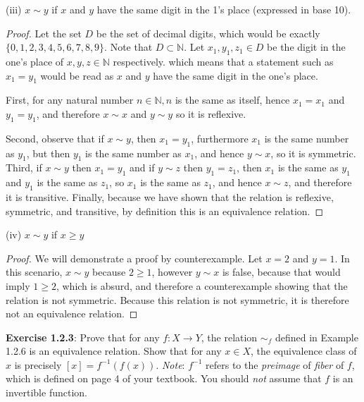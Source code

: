 \documentclass[a4paper]{article}
\begin{document}
\begin{myparindent}{0pt}
(iii) $x \sim y$ if $x$ and $y$ have the same digit in the 1's place (expressed in base 10). \newline
\begin{proof}
Let the set $D$ be the set of decimal digits, which would be exactly $\{0, 1, 2, 3, 4, 5, 6, 7, 8, 9\}$.
Note that $D \subset \mathbb{N}$.
Let $x_1, y_1, z_1 \in D$ be the digit in the one's place of $x, y, z \in \mathbb{N}$ respectively.
which means that a statement such as $x_1 = y_1$ would be read as $x$ and $y$ have the
same digit in the one's place.\newline
\newline

First, for any natural number $n \in \mathbb{N}, n$ is the same as itself,
hence $x_1 = x_1$ and $y_1 = y_1$, and therefore $x \sim x$ and $y \sim y$ so it is reflexive. \newline
\newline

Second, observe that if $x \sim y$, then $x_1 = y_1$, furthermore $x_1$ is the same number as $y_1$, but then $y_1$ is the same number as $x_1$,
and hence $y \sim x$, so it is symmetric. \newline
\newline
Third, if $x \sim y$ then $x_1 = y_1$ and if $y \sim z$ then $y_1 = z_1$, then $x_1$ is the same as $y_1$ and $y_1$ is the same as $z_1$,
so $x_1$ is the same as $z_1$, and hence $x \sim z$, and therefore it is transitive. \newline
\newline
Finally, because we have shown that the relation is reflexive, symmetric, and transitive, by definition
this is an equivalence relation.
\end{proof}


(iv) $x \sim y$ if $x \ge y$ \newline
\begin{proof}
We will demonstrate a proof by counterexample. Let $x = 2$ and $y = 1$. In this scenario, $x \sim y$ because
$2 \ge 1$, however $y \sim x$ is false, because that would imply $1 \ge 2$, which is absurd,
and therefore a counterexample showing that the relation is not symmetric.
Because this relation is not symmetric, it is therefore not an equivalence relation.
\end{proof}

\textbf{Exercise 1.2.3}:
Prove that for any $f: X \rightarrow Y$, the relation $\sim_f$ defined in Example 1.2.6 is an equivalence relation.
Show that for any $x \in X$, the equivalence class of $x$ is precisely $[x] = f^{-1}(f(x))$. \newline
\newline
\textit{Note}: $f^{-1}$ refers to the \textit{preimage} of \textit{fiber} of $f$, which is defined on page 4 of your textbook.
You should \textit{not} assume that $f$ is an invertible function.
\newline


\end{myparindent}
\end{document}
